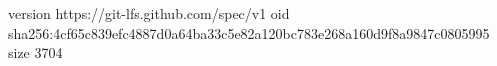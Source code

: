 version https://git-lfs.github.com/spec/v1
oid sha256:4cf65c839efc4887d0a64ba33c5e82a120bc783e268a160d9f8a9847c0805995
size 3704
